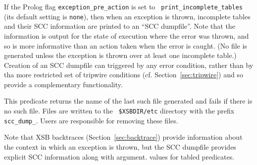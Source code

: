 \begin{description}
{%
%
%
}
%
If the Prolog flag {\tt exception\_pre\_action} is set to {\tt
  print\_incomplete\_tables} (its default setting is {\tt none}), then
when an exception is thrown, incomplete tables and their SCC
information are printed to an ``SCC dumpfile''.  Note that the
information is output for the state of execution where the error was
thrown, and so is more informative than an action taken when the error
is caught.  (No file is generated unless the exception is thrown over
at least one incomplete table.)  Creation of an SCC dumpfile can
triggered by any error condition, rather than by tha more restricted
set of tripwire conditions (cf. Section~\ref{sec:tripwire}) and so
provide a complementary functionality.

This predicate returns the name of the last such file generated and
fails if there is no such file.  Files are written to the {\tt
  \$XSBDIR/etc} directory with the prefix {\tt scc\_dump\_}.  Users
are responsible for removing these files.

Note that XSB backtraces (Section~\ref{sec:backtrace}) provide
information about the context in which an exception is thrown, but the
SCC dumpfile provides explicit SCC information along with argument.
values for tabled predicates.


\end{description}
